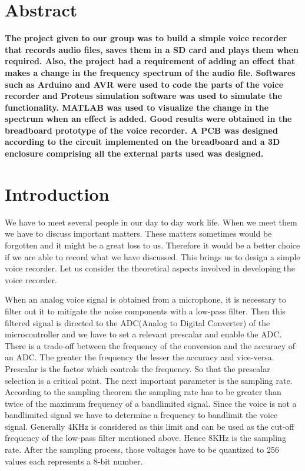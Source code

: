 \documentclass[11pt]{article}
\begin{document}
\section*{Abstract}
{\fontsize{10}{12}\selectfont\textbf{The project given to our group was to build a simple voice recorder that records audio files, saves them in a SD card and plays them when required. Also, the project had a requirement of adding an effect that makes a change in the frequency spectrum of the audio file. Softwares such as Arduino and AVR were used to code the parts of the voice recorder and Proteus simulation software was used to simulate the functionality. MATLAB was used to visualize the change in the spectrum when an effect is added. Good results were obtained in the breadboard prototype of the voice recorder. A PCB was designed according to the circuit implemented on the breadboard and a 3D enclosure comprising all the external parts used was designed.
}}
\section{Introduction}
We have to meet several people in our day to day work life. When we meet them we have to discuss important matters. These matters sometimes would be forgotten and it might be a great loss to us. Therefore it would be a better choice if we are able to record what we have discussed. This brings us to design a simple voice recorder. Let us consider the theoretical aspects involved in developing the voice recorder. 

When an analog voice signal is obtained from a microphone, it is necessary to filter out it to mitigate the noise components with a low-pass filter. Then this filtered signal is directed to the ADC(Analog to Digital Converter) of the microcontroller and we have to set a relevant prescalar and enable the ADC. There is a trade-off between the frequency of the conversion and the accuracy of an ADC. The greater the frequency the lesser the accuracy  and vice-versa. Prescalar is the factor which controls the frequency. So that the prescalar selection is a critical point. The next important parameter is the sampling rate. According to the sampling theorem\cite{sampling} the sampling rate has to be greater than twice of the maximum frequency of a bandlimited signal. Since the voice is not a bandlimited signal we have to determine a frequency to bandlimit the voice signal. Generally 4KHz is considered as this limit and can be used as the cut-off frequency of the low-pass filter mentioned above. Hence 8KHz is the sampling rate. After the sampling process, those voltages have to be quantized to 256 values each represents a 8-bit number. 
\end{document}
